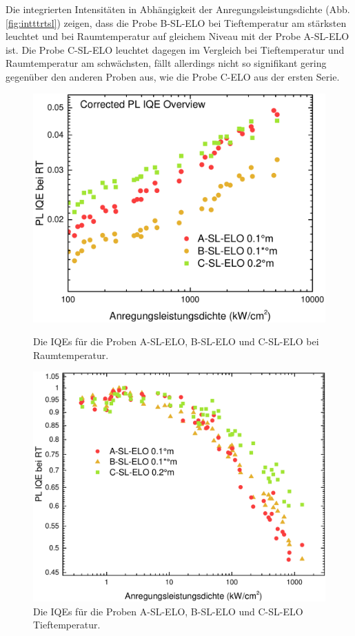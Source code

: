 \noindent 
Die integrierten Intensitäten in Abhängigkeit der Anregungsleistungsdichte (Abb. \ref{fig:intttrtsl}) zeigen, dass die Probe B-SL-ELO bei Tieftemperatur am stärksten leuchtet und bei Raumtemperatur auf gleichem Niveau mit der Probe A-SL-ELO ist. Die Probe C-SL-ELO leuchtet dagegen im Vergleich bei Tieftemperatur und Raumtemperatur am schwächsten, fällt allerdings nicht so signifikant gering gegenüber den anderen Proben aus, wie die Probe C-ELO aus der ersten Serie.
\begin{figure}[H]
  \centering
  \begin{minipage}[t]{0.49\textwidth}
    \centering
    \includegraphics[width=\textwidth]{Bilder/TS4048/corrIQERT.pdf}
		\caption{Die IQEs für die Proben A-SL-ELO, B-SL-ELO und C-SL-ELO bei Raumtemperatur.}
    \label{fig:eloiqeRT}
  \end{minipage}
	\hfill
  \begin{minipage}[t]{0.49\textwidth}
    \centering
    \includegraphics[width=\linewidth]{Bilder/TS4048/IQETT.pdf}
		\caption{Die IQEs für die Proben A-SL-ELO, B-SL-ELO und C-SL-ELO Tieftemperatur.}
    \label{fig:slelocorriqeRT}
  \end{minipage}
\end{figure}
